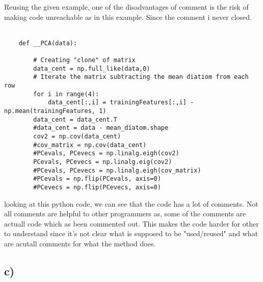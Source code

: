 Reusing the given example, one of the disadvantages of comment is the risk of making code unreachable
as in this example. Since the comment i never closed.
\\
\\
\begin{verbatim}
    def __PCA(data):
        
        # Creating "clone" of matrix
        data_cent = np.full_like(data,0) 
        # Iterate the matrix subtracting the mean diatiom from each row
        for i in range(4):
            data_cent[:,i] = trainingFeatures[:,i] - np.mean(trainingFeatures, 1)
        data_cent = data_cent.T
        #data_cent = data - mean_diatom.shape
        cov2 = np.cov(data_cent)
        #cov_matrix = np.cov(data_cent)
        #PCevals, PCevecs = np.linalg.eigh(cov2)
        PCevals, PCevecs = np.linalg.eig(cov2)
        #PCevals, PCevecs = np.linalg.eigh(cov_matrix)
        #PCevals = np.flip(PCevals, axis=0)
        #PCevecs = np.flip(PCevecs, axis=0)
\end{verbatim}
looking at this python code, we can see that the code has a lot of comments. Not all comments are helpful
to other programmers as, some of the comments are actuall code which as been commented out. This makes the
code harder for other to understand since it's not clear what is supposed to be "used/reused" and what are 
acutall comments for what the method does.


\subsection{c)}


